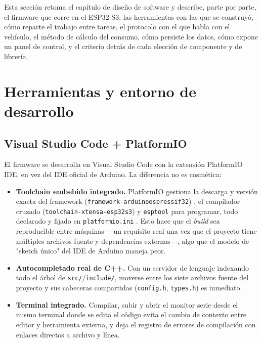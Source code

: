 Esta sección retoma el capítulo de diseño de software y describe, parte por
parte, el firmware que corre en el ESP32-S3: las herramientas con las que se
construyó, cómo reparte el trabajo entre tareas, el protocolo con el que
habla con el vehículo, el método de cálculo del consumo, cómo persiste los
datos, cómo expone un panel de control, y el criterio detrás de cada
elección de componente y de librería.

\section{Herramientas y entorno de desarrollo}
\label{sec:herramientas}

\subsection{Visual Studio Code + PlatformIO}
El firmware se desarrolla en Visual Studio Code con la extensión PlatformIO
IDE, en vez del IDE oficial de Arduino. La diferencia no es cosmética:

\begin{itemize}
  \item \textbf{Toolchain embebido integrado.} PlatformIO gestiona la
        descarga y versión exacta del framework
        (\texttt{framework-arduinoespressif32}) \cite{arduinoesp32core2024},
        el compilador cruzado (\texttt{toolchain-xtensa-esp32s3}) y
        \texttt{esptool} para programar, todo declarado y fijado en
        \texttt{platformio.ini} \cite{platformio2024}. Esto hace que el
        \textit{build} sea reproducible entre máquinas —un requisito real
        una vez que el proyecto tiene múltiples archivos fuente y
        dependencias externas—, algo que el modelo de "sketch único" del
        IDE de Arduino maneja peor.
  \item \textbf{Autocompletado real de C++.} Con un servidor de lenguaje
        indexando todo el árbol de \texttt{src/}/\texttt{include/}, moverse
        entre los siete archivos fuente del proyecto y sus cabeceras
        compartidas (\texttt{config.h}, \texttt{types.h}) es inmediato.
  \item \textbf{Terminal integrado.} Compilar, subir y abrir el monitor
        serie desde el mismo terminal donde se edita el código evita el
        cambio de contexto entre editor y herramienta externa, y deja el
        registro de errores de compilación con enlaces directos a archivo y
        línea.
\end{itemize}

